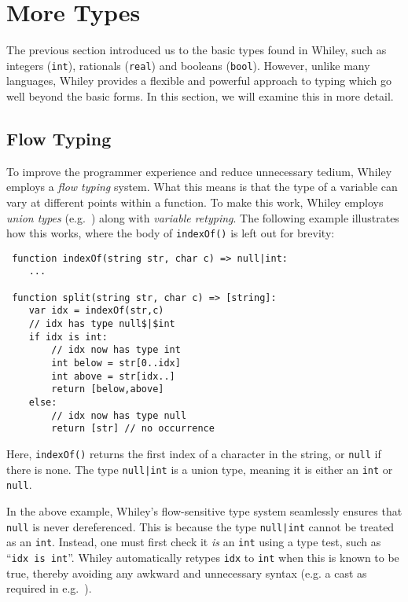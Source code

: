\newpage
\section{More Types}
The previous section introduced us to the basic types found in Whiley,
such as integers (\lstinline{int}), rationals (\lstinline{real}) and
booleans (\lstinline{bool}).  However, unlike many languages, Whiley
provides a flexible and powerful approach to typing which go well
beyond the basic forms.  In this section, we will examine this in more
detail.

\subsection{Flow Typing}
To improve the programmer experience and reduce unnecessary tedium,
Whiley employs a {\em flow typing} system.  What this means is that
the type of a variable can vary at different points within a function.
To make this work, Whiley employs {\em union types}
(e.g.~\cite{BC91,IN07}) along with {\em variable retyping}.  The
following example illustrates how this works, where the body of
\lstinline{indexOf()} is left out for brevity:

\begin{lstlisting}
 function indexOf(string str, char c) => null|int:
    ...

 function split(string str, char c) => [string]:
    var idx = indexOf(str,c)
    // idx has type null$|$int
    if idx is int:
        // idx now has type int
        int below = str[0..idx]
        int above = str[idx..]
        return [below,above]
    else:
        // idx now has type null
        return [str] // no occurrence
\end{lstlisting}
Here, \lstinline{indexOf()} returns the first index of a character in
the string, or \lstinline{null} if there is none.  The type
\lstinline{null|int} is a union type, meaning it is either an
\lstinline{int} or \lstinline{null}.

In the above example, Whiley's flow-sensitive type system seamlessly
ensures that \lstinline{null} is never dereferenced.  This is because
the type \lstinline{null|int} cannot be treated as an \lstinline{int}.
Instead, one must first check it {\em is} an \lstinline{int} using a
type test, such as ``\lstinline{idx is int}''.  Whiley automatically
retypes \lstinline{idx} to \lstinline{int} when this is known to be
true, thereby avoiding any awkward and unnecessary syntax (e.g. a cast
as required in e.g.~\cite{ANMM06,MPPD08}).

